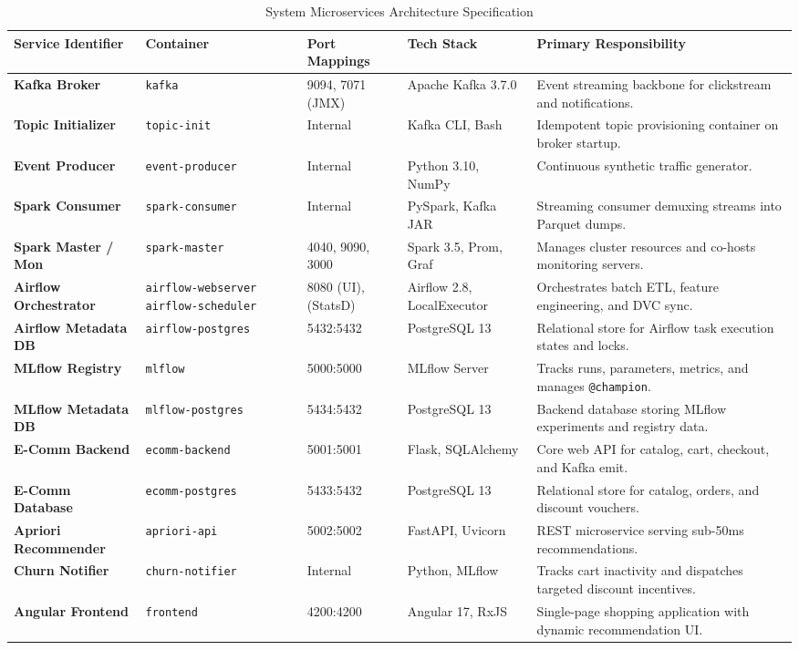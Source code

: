 \documentclass[11pt,a4paper]{article}
\begin{document}
\begin{table}[h]
\centering
\scriptsize
\begin{tabularx}{\textwidth}{@{}>{\bfseries}p{2.8cm}p{2.3cm}p{2.2cm}p{2.8cm}X@{}}
\toprule
\color{DeepNavy}Service Identifier & \color{DeepNavy}Container & \color{DeepNavy}Port Mappings & \color{DeepNavy}Tech Stack & \color{DeepNavy}Primary Responsibility \\
\midrule
Kafka Broker & \texttt{kafka} & 9094, 7071 (JMX) & Apache Kafka 3.7.0 & Event streaming backbone for clickstream and notifications. \\
Topic Initializer & \texttt{topic-init} & Internal & Kafka CLI, Bash & Idempotent topic provisioning container on broker startup. \\
Event Producer & \texttt{event-producer} & Internal & Python 3.10, NumPy & Continuous synthetic traffic generator. \\
Spark Consumer & \texttt{spark-consumer} & Internal & PySpark, Kafka JAR & Streaming consumer demuxing streams into Parquet dumps. \\
Spark Master / Mon & \texttt{spark-master} & 4040, 9090, 3000 & Spark 3.5, Prom, Graf & Manages cluster resources and co-hosts monitoring servers. \\
Airflow Orchestrator & \texttt{airflow-webserver} \newline \texttt{airflow-scheduler} & 8080 (UI), \newline 9091 (StatsD) & Airflow 2.8, \newline LocalExecutor & Orchestrates batch ETL, feature engineering, and DVC sync. \\
Airflow Metadata DB & \texttt{airflow-postgres} & 5432:5432 & PostgreSQL 13 & Relational store for Airflow task execution states and locks. \\
MLflow Registry & \texttt{mlflow} & 5000:5000 & MLflow Server & Tracks runs, parameters, metrics, and manages \texttt{@champion}. \\
MLflow Metadata DB & \texttt{mlflow-postgres} & 5434:5432 & PostgreSQL 13 & Backend database storing MLflow experiments and registry data. \\
E-Comm Backend & \texttt{ecomm-backend} & 5001:5001 & Flask, SQLAlchemy & Core web API for catalog, cart, checkout, and Kafka emit. \\
E-Comm Database & \texttt{ecomm-postgres} & 5433:5432 & PostgreSQL 13 & Relational store for catalog, orders, and discount vouchers. \\
Apriori Recommender & \texttt{apriori-api} & 5002:5002 & FastAPI, Uvicorn & REST microservice serving sub-50ms recommendations. \\
Churn Notifier & \texttt{churn-notifier} & Internal & Python, MLflow & Tracks cart inactivity and dispatches targeted discount incentives. \\
Angular Frontend & \texttt{frontend} & 4200:4200 & Angular 17, RxJS & Single-page shopping application with dynamic recommendation UI. \\
\bottomrule
\end{tabularx}
\caption{System Microservices Architecture Specification}
\end{table}
\end{document}
